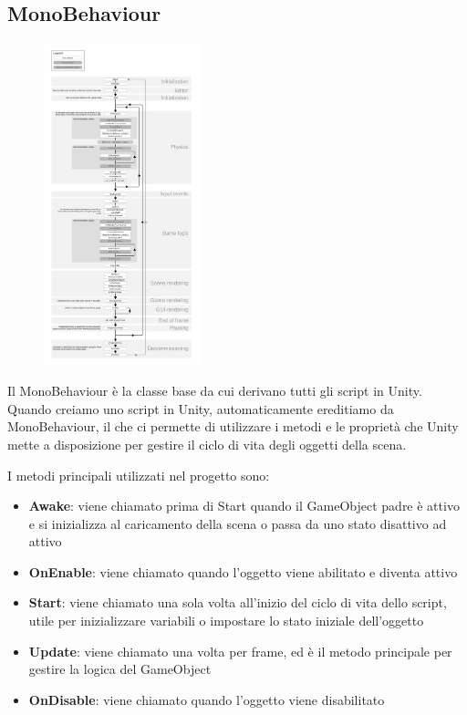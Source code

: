 \subsection{MonoBehaviour}
\begin{figure} %
    \centering
    \includegraphics[width=0.40\textwidth]{figures/chapter_1/monobehaviour_flowchart.jpg}
\end{figure}
Il MonoBehaviour è la classe base da cui derivano tutti gli script in Unity. Quando creiamo uno script in Unity, automaticamente ereditiamo da MonoBehaviour, il che ci permette di utilizzare i metodi e le proprietà che Unity mette a disposizione per gestire il ciclo di vita degli oggetti della scena.
\cite{MonoBehaviour} 

I metodi principali utilizzati nel progetto sono:
\begin{itemize}
    \item \textbf{Awake}: viene chiamato prima di Start quando il GameObject padre è attivo e si inizializza al caricamento della scena o passa da uno stato disattivo ad attivo \cite{AwakeMonoBehaviour}
    \item \textbf{OnEnable}: viene chiamato quando l'oggetto viene abilitato e diventa attivo \cite{OnEnableMonoBehaviour}
    \item \textbf{Start}: viene chiamato una sola volta all'inizio del ciclo di vita dello script, utile per inizializzare variabili o impostare lo stato iniziale dell'oggetto \cite{StartMonoBehaviour}
    \item \textbf{Update}: viene chiamato una volta per frame, ed è il metodo principale per gestire la logica del GameObject \cite{UpdateMonoBehaviour}
    \item \textbf{OnDisable}: viene chiamato quando l'oggetto viene disabilitato \cite{OnDisableMonoBehaviour}
\end{itemize}

